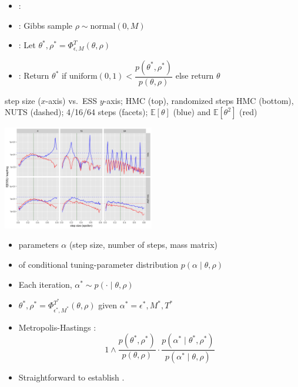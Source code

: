 \documentclass[10pt]{report}
\begin{document}
\begin{itemize}
\item {}:
\item {}: Gibbs sample $\rho \sim \textrm{normal}(0, M)$
\item {}:  Let $\theta^*, \rho^* = \Phi_{\epsilon,M}^T(\theta, \rho)$
\item {}: Return $\theta^*$ if $\textrm{uniform}(0, 1) <
  \dfrac{p(\theta^*, \rho^*)}
       {p(\theta, \rho)}$ else return $\theta$
\end{itemize}

\begin{subitemize}
\item step size ($x$-axis) vs.\ ESS $y$-axis; HMC (top), randomized
  steps HMC (bottom), NUTS (dashed); 
  4/16/64 steps (facets); $\mathbb{E}[\theta]$ (blue) and
  $\mathbb{E}[\theta^2]$ (red)
\end{subitemize}
\vspace*{-3pt}
\begin{center}
  \includegraphics[width=2.6in]{img/hmc-harmonics.png}
\end{center}

\begin{itemize}
\item {} parameters $\alpha$ (step
  size, number of steps, mass matrix)
\item {} of conditional tuning-parameter distribution $p(\alpha \mid \theta, \rho)$
\item Each iteration,  $\alpha^* \sim p( \cdot \mid \theta,
  \rho)$
\item {} $\theta^*, \rho^* = \Phi^{T^*}_{\epsilon^*,
    M^*}(\theta, \rho)$ given $\alpha^* = \epsilon^*,
  M^*, T^*$
\item Metropolis-Hastings :
  $$
  1 \wedge
  \dfrac{p(\theta^*, \rho^*)}
  {p(\theta, \rho)}
  \cdot
  \dfrac{p(\alpha^* \mid \theta^*, \rho^*)}
       {p(\alpha^* \mid \theta, \rho)}
       $$
\item Straightforward to establish .
\end{itemize}
\end{document}

